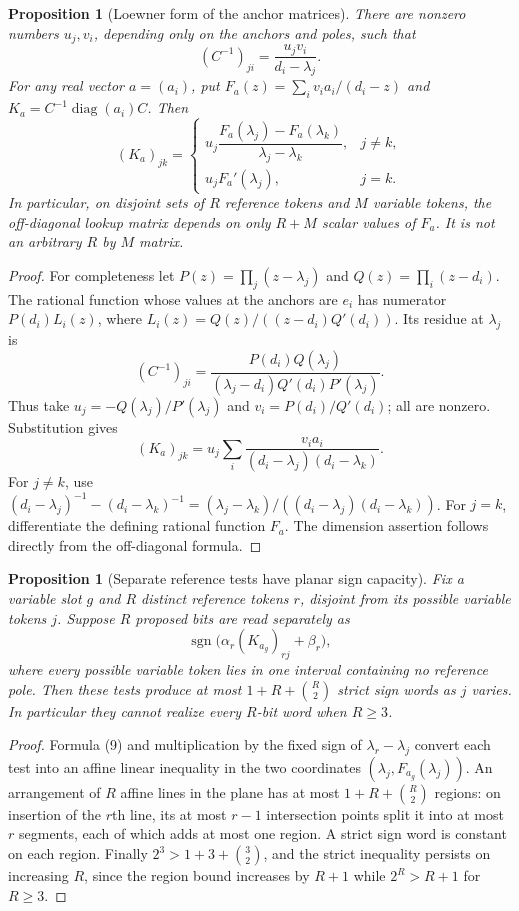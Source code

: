 \documentclass[11pt]{article}
\newtheorem{proposition}[theorem]{Proposition}
\begin{document}
\begin{proposition}[Loewner form of the anchor matrices]
There are nonzero numbers $u_j,v_i$, depending only on the anchors and
poles, such that
\[
 (C^{-1})_{ji}=\frac{u_jv_i}{d_i-\lambda_j}.
\]
For any real vector $a=(a_i)$, put
$F_a(z)=\sum_i v_i a_i/(d_i-z)$ and
$K_a=C^{-1}\operatorname{diag}(a_i)C$. Then
\[
 (K_a)_{jk}=
 \begin{cases}
 u_j\dfrac{F_a(\lambda_j)-F_a(\lambda_k)}{\lambda_j-\lambda_k},&j\ne k,\\[6pt]
 u_jF_a'(\lambda_j),&j=k.
 \end{cases} \tag{9}
\]
In particular, on disjoint sets of $R$ reference tokens and $M$ variable
tokens, the off-diagonal lookup matrix depends on only $R+M$ scalar
values of $F_a$. It is not an arbitrary $R$ by $M$ matrix.
\end{proposition}

\begin{proof}
For completeness let
$P(z)=\prod_j(z-\lambda_j)$ and $Q(z)=\prod_i(z-d_i)$.
The rational function whose values at the anchors are $e_i$ has
numerator $P(d_i)L_i(z)$, where
$L_i(z)=Q(z)/((z-d_i)Q'(d_i))$.
Its residue at $\lambda_j$ is
\[
 (C^{-1})_{ji}
 =\frac{P(d_i)Q(\lambda_j)}
        {(\lambda_j-d_i)Q'(d_i)P'(\lambda_j)}.
\]
Thus take $u_j=-Q(\lambda_j)/P'(\lambda_j)$ and
$v_i=P(d_i)/Q'(d_i)$; all are nonzero. Substitution gives
\[
 (K_a)_{jk}=u_j\sum_i
 \frac{v_i a_i}{(d_i-\lambda_j)(d_i-\lambda_k)}.
\]
For $j\ne k$, use
$(d_i-\lambda_j)^{-1}-(d_i-\lambda_k)^{-1}
=(\lambda_j-\lambda_k)/((d_i-\lambda_j)(d_i-\lambda_k))$.
For $j=k$, differentiate the defining rational function $F_a$.
The dimension assertion follows directly from the off-diagonal formula.
\end{proof}

\begin{proposition}[Separate reference tests have planar sign capacity]
Fix a variable slot $g$ and $R$ distinct reference tokens $r$, disjoint
from its possible variable tokens $j$. Suppose $R$ proposed bits are
read separately as
\[
 \operatorname{sgn}\bigl(\alpha_r(K_{a_g})_{rj}+\beta_r\bigr),
\]
where every possible variable token lies in one interval containing no
reference pole. Then these tests produce at most
$1+R+\binom R2$ strict sign words as $j$ varies. In particular they
cannot realize every $R$-bit word when $R\geq3$.
\end{proposition}

\begin{proof}
Formula (9) and multiplication by the fixed sign of
$\lambda_r-\lambda_j$ convert each test into an affine linear
inequality in the two coordinates
$(\lambda_j,F_{a_g}(\lambda_j))$.
An arrangement of $R$ affine lines in the plane has at most
$1+R+\binom R2$ regions: on insertion of the $r$th line, its at most
$r-1$ intersection points split it into at most $r$ segments, each
of which adds at most one region. A strict sign word is constant on
each region. Finally $2^3>1+3+\binom32$, and the strict inequality
persists on increasing $R$, since the region bound increases by $R+1$
while $2^R>R+1$ for $R\geq3$.
\end{proof}
\end{document}
